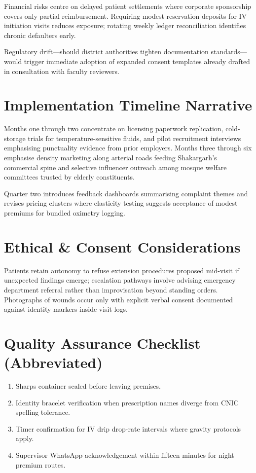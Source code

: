 \documentclass[12pt,a4paper]{report}
\begin{document}
Financial risks centre on delayed patient settlements where corporate sponsorship covers only partial reimbursement. Requiring modest reservation deposits for IV initiation visits reduces exposure; rotating weekly ledger reconciliation identifies chronic defaulters early.

Regulatory drift---should district authorities tighten documentation standards---would trigger immediate adoption of expanded consent templates already drafted in consultation with faculty reviewers.

\chapter{Implementation Timeline Narrative}

Months one through two concentrate on licensing paperwork replication, cold-storage trials for temperature-sensitive fluids, and pilot recruitment interviews emphasising punctuality evidence from prior employers. Months three through six emphasise density marketing along arterial roads feeding Shakargarh's commercial spine and selective influencer outreach among mosque welfare committees trusted by elderly constituents.

Quarter two introduces feedback dashboards summarising complaint themes and revises pricing clusters where elasticity testing suggests acceptance of modest premiums for bundled oximetry logging.

\chapter{Ethical \& Consent Considerations}

Patients retain autonomy to refuse extension procedures proposed mid-visit if unexpected findings emerge; escalation pathways involve advising emergency department referral rather than improvisation beyond standing orders. Photographs of wounds occur only with explicit verbal consent documented against identity markers inside visit logs.

\chapter{Quality Assurance Checklist (Abbreviated)}

\begin{enumerate}
  \item Sharps container sealed before leaving premises.
  \item Identity bracelet verification when prescription names diverge from CNIC spelling tolerance.
  \item Timer confirmation for IV drip drop-rate intervals where gravity protocols apply.
  \item Supervisor WhatsApp acknowledgement within fifteen minutes for night premium routes.
\end{enumerate}
\end{document}
